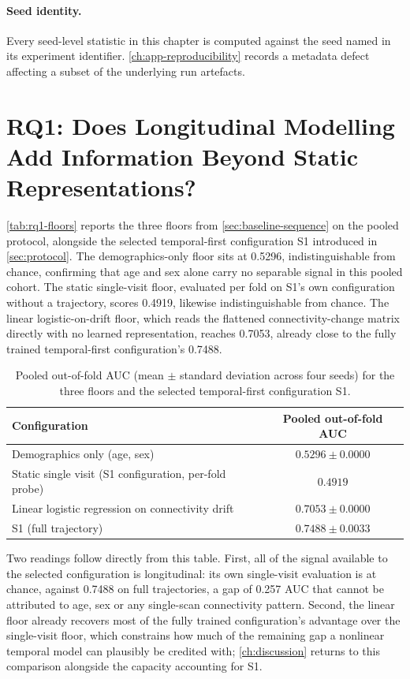 \paragraph{Seed identity.} Every seed-level statistic in this chapter is computed against
the seed named in its experiment identifier. \autoref{ch:app-reproducibility} records a
metadata defect affecting a subset of the underlying run artefacts.

\section{RQ1: Does Longitudinal Modelling Add Information Beyond Static Representations?}\label{sec:rq1}

\autoref{tab:rq1-floors} reports the three floors from \autoref{sec:baseline-sequence} on the
pooled protocol, alongside the selected temporal-first configuration S1 introduced in
\autoref{sec:protocol}. The demographics-only floor sits at 0.5296, indistinguishable from
chance, confirming that age and sex alone carry no separable signal in this pooled cohort.
The static single-visit floor, evaluated per fold on S1's own configuration without a
trajectory, scores 0.4919, likewise indistinguishable from chance. The linear
logistic-on-drift floor, which reads the flattened connectivity-change matrix directly with
no learned representation, reaches 0.7053, already close to the fully trained temporal-first
configuration's 0.7488.

\begin{table}[htbp]
\centering
\caption{Pooled out-of-fold \ac{AUC} (mean $\pm$ standard deviation across four seeds) for
  the three floors and the selected temporal-first configuration S1.}
\label{tab:rq1-floors}
\begin{tabular}{@{}lc@{}}
\toprule
Configuration & Pooled out-of-fold \ac{AUC} \\
\midrule
Demographics only (age, sex) & $0.5296 \pm 0.0000$ \\
Static single visit (S1 configuration, per-fold probe) & $0.4919$ \\
Linear logistic regression on connectivity drift & $0.7053 \pm 0.0000$ \\
S1 (full trajectory) & $0.7488 \pm 0.0033$ \\
\bottomrule
\end{tabular}
\end{table}

Two readings follow directly from this table. First, all of the signal available to the
selected configuration is longitudinal: its own single-visit evaluation is at chance,
against 0.7488 on full trajectories, a gap of 0.257 \ac{AUC} that cannot be attributed to
age, sex or any single-scan connectivity pattern. Second, the linear floor already recovers
most of the fully trained configuration's advantage over the single-visit floor, which
constrains how much of the remaining gap a nonlinear temporal model can plausibly be
credited with; \autoref{ch:discussion} returns to this comparison alongside the capacity
accounting for S1.

